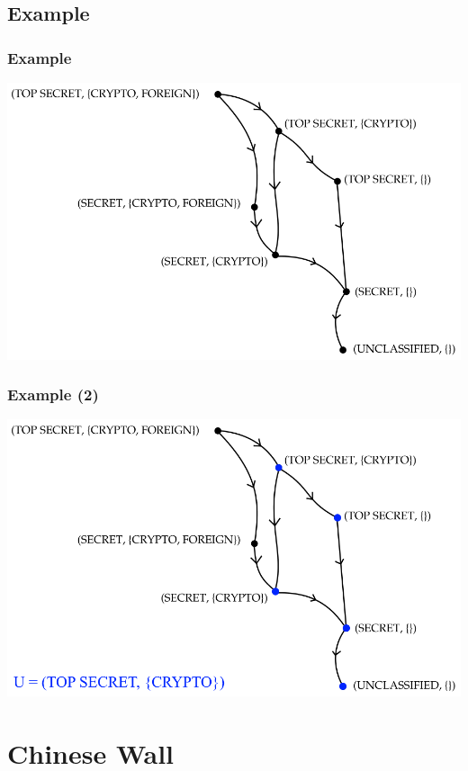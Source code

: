 \documentclass[10pt]{beamer}
\begin{document}
\subsection{Example}
\begin{frame}
	\frametitle{Example}
	
	\includegraphics[width=\textwidth]{graphics/blp_lattice}
\end{frame}

\begin{frame}
	\frametitle{Example (2)}
	
	\includegraphics[width=\textwidth]{graphics/blp_lattice_2}
\end{frame}


\section{Chinese Wall}
\end{document}
